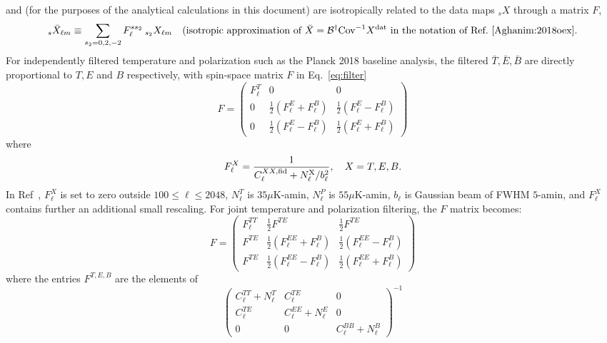 \documentclass{article}
\newcommand{\Cov}[0]{{\textrm{Cov}}}
\begin{document}
and (for the purposes of the analytical calculations in this document) are isotropically related to the data maps $_sX$ through a matrix $F$,
\begin{equation}\label{eq:filter}
	_{s}\bar X_{\ell m} \equiv \sum_{s_2 = 0,2,-2}F_\ell^{s s_2} \:_{s_2}X_{\ell m} \quad \textrm{(isotropic approximation of } \bar X = \mathcal B^\dagger \Cov^{-1} X ^\textrm{\rm dat}\textrm{ in the notation of Ref.~\cite{Aghanim:2018oex}}.
\end{equation} 
For independently filtered temperature and polarization such as the Planck 2018 baseline analysis, the filtered $\bar T, \bar E, \bar B$ are directly proportional to $T, E$ and $B$ respectively, with spin-space matrix $F$ in Eq.~\eqref{eq:filter}
\begin{equation}
	F = \begin{pmatrix}
		F^T_\ell & 0 & 0 \\ 0 & \frac 12 \left( F^{E}_\ell  + F^{B}_\ell\right) & \frac 12 \left( F^{E}_\ell  - F^{B}_\ell\right) \\ 0& \frac 12 \left( F^{E}_\ell  - F^{B}_\ell\right) & \frac 12 \left( F^{E}_\ell  + F^{B}_\ell\right)
	\end{pmatrix}
\end{equation}
where
\begin{equation}
F_\ell^{X} = \frac{1}{C_\ell^{XX,\rm fid} + N_\ell^{\rm X} /b_\ell^2}, \quad X = T,E,B.
\end{equation}
In Ref~\cite{Aghanim:2018oex}, $F_\ell^{X}$ is set to zero outside $100 \le \ell \le 2048$, $N^T_\ell$ is $35 \mu$K-amin, $N^P_\ell$ is $55 \mu$K-amin, $b_\ell$ is Gaussian beam of FWHM $5$-amin, and $F_\ell^X$ contains further an additional small rescaling. 
For joint temperature and polarization filtering, the $F$ matrix becomes:
\begin{equation}
	F = \begin{pmatrix}
		F^{TT}_\ell &  \frac 12 F^{TE} &  \frac 12 F^{TE} \\  F^{TE} & \frac 12 \left( F^{EE}_\ell  + F^{B}_\ell\right) & \frac 12 \left( F^{EE}_\ell  - F^{B}_\ell\right) \\ F^{TE}& \frac 12 \left( F^{EE}_\ell  - F^{B}_\ell\right) & \frac 12 \left( F^{EE}_\ell  + F^{B}_\ell\right)
	\end{pmatrix}
\end{equation}
where the entries $F^{T, E, B}$ are the elements of
\begin{equation}
 \begin{pmatrix}  C_\ell^{TT} + N_\ell^T &C^{TE}_\ell &  0 \\ C^{TE}_\ell & C_\ell^{EE} + N_\ell^E  & 0\\  0 & 0 &  C_\ell^{BB} + N_\ell^B
 	
 \end{pmatrix}^{-1}
\end{equation}
\end{document}
